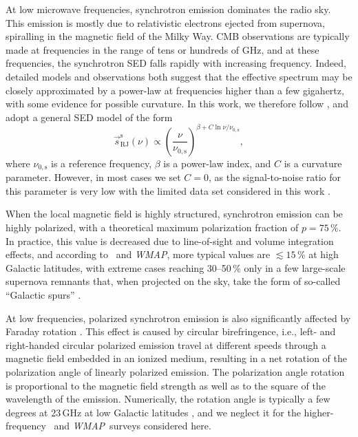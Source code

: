 \documentclass[onecolumn]{aa}
\def\WMAP{\emph{WMAP}}
\newcommand{\s}[0]{\vec{s}}
\begin{document}
At low microwave frequencies, synchrotron emission dominates the radio
sky. This emission is mostly due to relativistic electrons ejected
from supernova, spiralling in the magnetic field of the Milky Way. CMB
observations are typically made at frequencies in the range of tens or
hundreds of GHz, and at these frequencies, the synchrotron SED falls
rapidly with increasing frequency. Indeed, detailed models and observations both
suggest that the effective spectrum may be closely approximated by a
power-law at frequencies higher than a few gigahertz, with some
evidence for possible curvature. In this work, we therefore follow
\citet{kogut:2012}, and adopt a general SED model of the form
\begin{equation}
  \s_{\mathrm{RJ}}^{\mathrm{s}}(\nu) \propto
  \left(\frac{\nu}{\nu_{0,\mathrm{s}}} \right)^{\beta + C\ln \nu/\nu_{0,\mathrm{s}}},
\end{equation}
where $\nu_{0,\mathrm{s}}$ is a reference frequency, $\beta$ is a
power-law index, and $C$ is a curvature parameter. However, in most
cases we set $C=0$, as the signal-to-noise ratio for this parameter is
very low with the limited data set considered in this work \citep{bp14}.

When the local magnetic field is highly structured, synchrotron
emission can be highly polarized, with a theoretical maximum
polarization fraction of $p=75\,\%$. In practice, this value is
decreased due to line-of-sight and volume integration effects, and
according to \Planck\ and \WMAP, more typical values are
$\lesssim15\,\%$ at high Galactic latitudes, with extreme cases
reaching 30--50\,\% only in a few large-scale supernova remnants that,
when projected on the sky, take the form of so-called ``Galactic
spurs'' \citep{planck2014-a31}.

At low frequencies, polarized synchrotron emission is also
significantly affected by Faraday rotation \citep[e.g.,][and
  references therein]{beck:2013}. This effect is caused by circular
birefringence, i.e., left- and right-handed circular polarized
emission travel at different speeds through a magnetic field embedded
in an ionized medium, resulting in a net rotation of the polarization
angle of linearly polarized emission. The polarization angle rotation
is proportional to the magnetic field strength as well as to the
square of the wavelength of the emission. Numerically, the rotation
angle is typically a few degrees at 23\,GHz at low Galactic latitudes
\citep{Carretti:2019, fuskeland:2019}, and we neglect it for
the higher-frequency \Planck\ and \WMAP\ surveys considered here.
\end{document}
